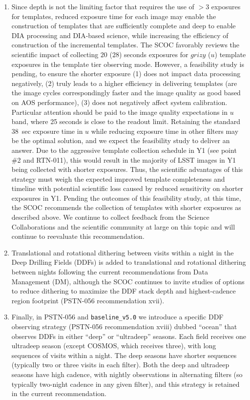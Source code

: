 \documentclass[SE,authoryear,toc]{lsstdoc}
\begin{document}
\begin{enumerate}
\item Since depth is not the limiting factor that requires the use of $>3$ exposures for templates, reduced exposure time for each image may enable the construction of templates that are sufficiently complete and deep to enable DIA processing and DIA-based science, while increasing the efficiency of construction of the incremental templates. The SCOC favorably reviews the scientific impact of collecting $20$ ($28$) seconds exposures for $grizy$ ($u$) template exposures in the template tier observing mode. However, a feasibility study is pending, to ensure the shorter exposure (1) does not impact data processing negatively, (2) truly leads to a higher efficiency in delivering templates (\eg are the image cycles correspondingly faster and the image quality as good based on AOS performance), (3) does not negatively affect system calibration. Particular attention should be paid to the image quality expectations in $u$ band, where 25 seconds is close to the readout limit. Retaining the standard $38$~sec exposure time in $u$ while reducing exposure time in other filters may be the optimal solution, and we expect the feasibility study to deliver an answer. Due to the aggressive template collection schedule in Y1 (see point \#2 and RTN-011), this would result in the majority of LSST images in Y1 being collected with shorter exposures. Thus, the scientific advantages of this strategy must weigh the expected improved template completeness and timeline with potential scientific loss caused by reduced sensitivity on shorter exposures in Y1. Pending the outcomes of this feasibility study, at this time, the SCOC recommends the collection of templates with shorter exposures as described above. We continue to collect feedback from the Science Collaborations and the scientific community at large on this topic and will continue to reevaluate this recommendation. 

\item Translational and rotational dithering between visits within a night in the Deep Drilling Fields (DDFs) is added to translational and rotational dithering between nights following the current recommendations from Data Management (DM), although the SCOC continues to invite studies of options to reduce dithering to maximize the DDF stack depth and highest-cadence region footprint (PSTN-056 recommendation xvii).

\item Finally, in PSTN-056 and \texttt{baseline\_v5.0} we introduce a specific DDF observing strategy (PSTN-056 recommendation xviii) dubbed ``ocean'' that observes DDFs in either ``deep'' or ``ultradeep'' seasons.  Each field receives one ultradeep season (except COSMOS, which receives three), with long sequences of visits within a night. The deep seasons have shorter sequences (typically two or three visits in each filter). Both the deep and ultradeep seasons have high cadence, with nightly observations in alternating filters (so typically two-night cadence in any given filter), and this strategy is retained in the current recommendation.
\end{enumerate}
\end{document}
